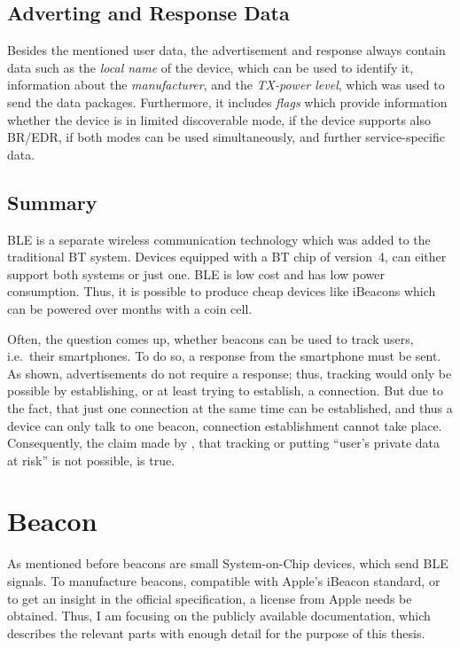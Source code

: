 \subsection*{Adverting and Response Data}
Besides the mentioned user data, the advertisement and response always contain data such as the \emph{local name} of the device, which can be used to identify it, information about the \emph{manufacturer}, and the \emph{\ac{TX}-power level}, which was used to send the data packages. Furthermore, it includes \emph{flags} which provide information whether the device is in limited discoverable mode, if the device supports also \ac{BR}/\ac{EDR}, if both modes can be used simultaneously, and further service-specific data.


\subsection*{Summary}
\acl{BLE} is a separate wireless communication technology which was added to the traditional \acl{BT} system. Devices equipped with a \ac{BT} chip of version~4, can either support both systems or just one. \ac{BLE} is low cost and has low power consumption. Thus, it is possible to produce cheap devices like iBeacons which can be powered over months with a coin cell.

Often, the question comes up, whether beacons can be used to track users, i.e.\ their smartphones. To do so, a response from the smartphone must be sent. As shown, advertisements do not require a response; thus, tracking would only be possible by establishing, or at least trying to establish, a connection. But due to the fact, that just one connection at the same time can be established, and thus a device can only talk to one beacon, connection establishment cannot take place. Consequently, the claim made by \citet{apple:getting_started}, that tracking or putting ``user's private data at risk'' is not possible, is true.

\section{Beacon}\label{sec:beacon}
As mentioned before beacons are small System-on-Chip devices, which send \acs{BLE} signals. To manufacture beacons, compatible with Apple's iBeacon standard, or to get an insight in the official specification, a license from Apple needs be obtained. Thus, I am focusing on the publicly available documentation, which describes the relevant parts with enough detail for the purpose of this thesis.

